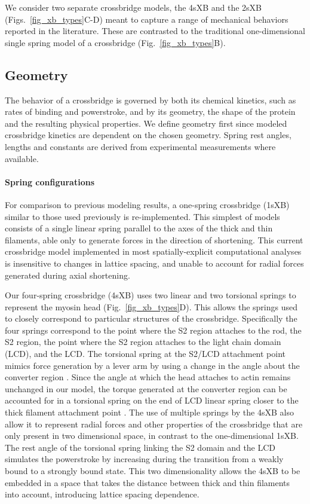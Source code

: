 \documentclass[]{article}
\begin{document}
We consider two separate crossbridge models, the 4sXB and the 2sXB (Figs.~\ref{fig_xb_types}C-D) meant to capture a range of mechanical behaviors reported in the literature.  
These are contrasted to the traditional one-dimensional single spring model of a crossbridge (Fig.~\ref{fig_xb_types}B).

\subsection*{Geometry} %

The behavior of a crossbridge is governed by both its chemical kinetics, such as rates of binding and powerstroke, and by its geometry, the shape of the protein and the resulting physical properties.
We define geometry first since modeled crossbridge kinetics are dependent on the chosen geometry.
Spring rest angles, lengths and constants are derived from experimental measurements where available.

\paragraph{Spring configurations} %
For comparison to previous modeling results, a one-spring crossbridge (1sXB) similar to those used previously is re-implemented.
This simplest of models consists of a single linear spring parallel to the axes of the thick and thin filaments, able only to generate forces in the direction of shortening. 
This current crossbridge model implemented in most spatially-explicit computational analyses \citep{Daniel1998, Chase:2004:p204, Tanner2007} is insensitive to changes in lattice spacing, and unable to account for radial forces generated during axial shortening.

Our four-spring crossbridge (4sXB) uses two linear and two torsional springs to represent the myosin head (Fig.~\ref{fig_xb_types}D).
This allows the springs used to closely correspond to particular structures of the crossbridge.
Specifically the four springs correspond to the point where the S2 region attaches to the rod, the S2 region, the point where the S2 region attaches to the light chain domain (LCD), and the LCD. 
The torsional spring at the S2/LCD attachment point mimics force generation by a lever arm by using a change in the angle about the converter region \citep{Houdusse2000, Houdusse2001}. 
Since the angle at which the head attaches to actin remains unchanged in our model, the torque generated at the converter region can be accounted for in a torsional spring on the end of LCD linear spring closer to the thick filament attachment point \citep{Lauzon2001}. %
The use of multiple springs by the 4sXB also allow it to represent radial forces and other properties of the crossbridge that are only present in two dimensional space, in contrast to the one-dimensional 1sXB. 
The rest angle of the torsional spring linking the S2 domain and the LCD simulates the powerstroke by increasing during the transition from a weakly bound to a strongly bound state.
This two dimensionality allows the 4sXB to be embedded in a space that takes the distance between thick and thin filaments into account, introducing lattice spacing dependence.
\end{document}

